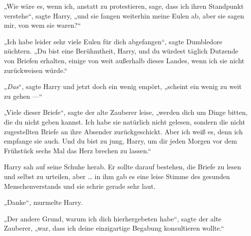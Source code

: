 „Wie wäre es, wenn ich, anstatt zu protestieren, sage, dass ich ihren Standpunkt verstehe“, sagte Harry, „und sie fangen weiterhin meine Eulen ab, aber sie sagen mir, von wem sie waren?“

„Ich habe leider sehr viele Eulen für dich abgefangen“, sagte Dumbledore nüchtern.
„Du bist eine Berühmtheit, Harry, und du würdest täglich Dutzende von Briefen erhalten, einige von weit außerhalb dieses Landes, wenn ich sie nicht zurückweisen würde.“

„\emph{Das}“, sagte Harry und jetzt doch ein wenig empört, „scheint ein wenig zu weit zu gehen —“

„Viele dieser Briefe“, sagte der alte Zauberer leise, „werden dich um Dinge bitten, die du nicht geben kannst. Ich habe sie natürlich nicht gelesen, sondern die nicht zugestellten Briefe an ihre Absender zurückgeschickt. Aber ich weiß es, denn ich empfange sie auch. Und du bist zu jung, Harry, um dir jeden Morgen vor dem Frühstück sechs Mal das Herz brechen zu lassen.“

Harry sah auf seine Schuhe herab. Er sollte darauf bestehen, die Briefe zu lesen und selbst zu urteilen, aber … in ihm gab es eine leise Stimme des gesunden Menschenverstands und sie schrie gerade sehr laut.

„Danke“, murmelte Harry.

„Der andere Grund, warum ich dich hierhergebeten habe“, sagte der alte Zauberer, „war, dass ich deine einzigartige Begabung konsultieren wollte.“

